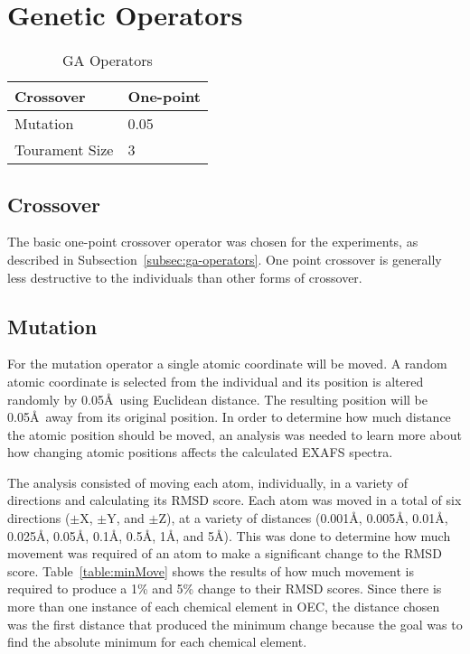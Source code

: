 \section{Genetic Operators}
\label{sec:ga-operators}

\begin{table}
	\centering
	\begin{tabular}{ | l | l | }
		\hline
		Crossover & One-point \\ \hline
		Mutation & 0.05 \\ \hline
		Tourament Size & 3 \\ \hline
	\end{tabular}
	\caption{GA Operators}
	\label{table:ga-operators}
\end{table}

\subsection{Crossover}

The basic one-point crossover operator was chosen for the experiments, as described in Subsection~\ref{subsec:ga-operators}. One point crossover is generally less destructive to the individuals than other forms of crossover. %

\subsection{Mutation}
\label{subsec:mutation}

For the mutation operator a single atomic coordinate will be moved. A random atomic coordinate is selected from the individual and its position is altered randomly by 0.05\AA\  using Euclidean distance. The resulting position will be 0.05\AA\ away from its original position. In order to determine how much distance the atomic position should be moved, an analysis was needed to learn more about how changing atomic positions affects the calculated EXAFS spectra.

The analysis consisted of moving each atom, individually, in a variety of directions and calculating its RMSD score. Each atom was moved in a total of six directions ($\pm$X, $\pm$Y, and $\pm$Z), at a variety of distances (0.001\AA, 0.005\AA, 0.01\AA, 0.025\AA, 0.05\AA, 0.1\AA, 0.5\AA, 1\AA, and 5\AA). This was done to determine how much movement was required of an atom to make a significant change to the RMSD score. Table~\ref{table:minMove} shows the results of how much movement is required to produce a 1\% and 5\% change to their RMSD scores. Since there is more than one instance of each chemical element in OEC, the distance chosen was the first distance that produced the minimum change because the goal was to find the absolute minimum for each chemical element.

